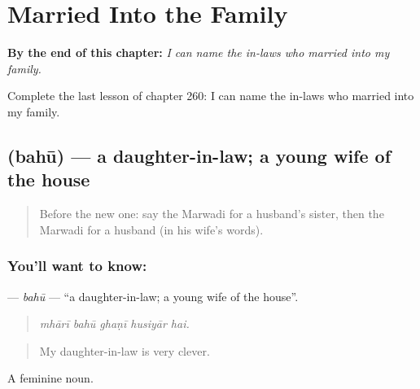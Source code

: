 
\chapter{Married Into the Family}
\label{ch:mw-married-into-the-family}

\begin{chapteropening}
\textbf{By the end of this chapter:} \emph{I can name the in-laws who married into my family.}

Complete the last lesson of chapter 260: I can name the in-laws who married into my family.
\end{chapteropening}

\section[\texorpdfstring{\mw{बहू} (bahū)}{बहू (bahū)}]{ (bahū) — a daughter-in-law; a young wife of the house}

\label{lesson:MW-C260-bahu}



\begin{quote}
Before the new one: say the Marwadi for a husband's sister, then the Marwadi for a husband (in his wife's words).
\end{quote}

\subsection*{You'll want to know: }
\textbf{} — \emph{bahū} — \textquotedblleft{}a daughter-in-law; a young wife of the house\textquotedblright{}.

\begin{quote}
    
\end{quote}

\begin{quote}
\emph{mhārī bahū ghaṇī husiyār hai.}
\end{quote}

\begin{quote}
My daughter-in-law is very clever.
\end{quote}

A feminine noun.

